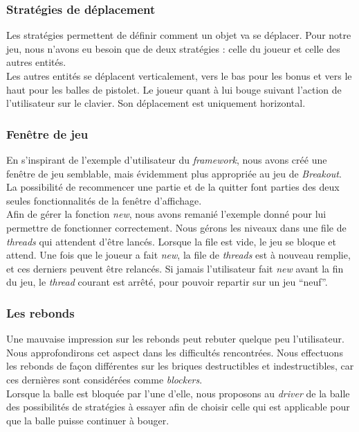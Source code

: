 \documentclass[a4paper,10pt]{article}
\begin{document}
    \subsubsection{Stratégies de déplacement}
        Les stratégies permettent de définir comment un objet va se déplacer. Pour notre jeu, nous n'avons eu besoin
        que de deux stratégies  : celle du joueur et celle des autres entités. \\ Les autres entités
        se déplacent verticalement, vers le bas pour les bonus et vers le haut pour les balles de pistolet.
        Le joueur quant à lui bouge suivant l'action de l'utilisateur sur le clavier. Son déplacement est uniquement horizontal.

    \subsubsection{Fenêtre de jeu}
        En s'inspirant de l'exemple d'utilisateur du \textit{framework}, nous avons créé une fenêtre de jeu semblable,
        mais évidemment plus appropriée au jeu de \textit{Breakout}. La possibilité de recommencer une partie et de la quitter
        font parties des deux seules fonctionnalités de la fenêtre d'affichage. \\

        Afin de gérer la fonction \textit{new}, nous avons remanié l'exemple donné pour lui permettre de fonctionner
        correctement. Nous gérons les niveaux dans une file de \textit{threads} qui attendent d'être lancés. Lorsque la file
        est vide, le jeu se bloque et attend. Une fois que le joueur a fait \textit{new}, la file de \textit{threads} est
        à nouveau remplie, et ces derniers peuvent être relancés. Si jamais l'utilisateur fait \textit{new} avant
        la fin du jeu, le \textit{thread} courant est arrêté, pour pouvoir repartir sur un jeu ``neuf''.

    \subsubsection{Les rebonds}
        Une mauvaise impression sur les rebonds peut rebuter quelque peu l'utilisateur. Nous approfondirons
        cet aspect dans les difficultés rencontrées.  Nous effectuons les rebonds de façon
        différentes sur les briques destructibles et indestructibles, car ces dernières sont considérées comme \textit{blockers}. \\
        Lorsque la balle est bloquée par l'une d'elle, nous proposons au \textit{driver} de la balle des possibilités
        de stratégies à essayer afin de choisir celle qui est applicable pour que la balle puisse continuer à bouger. \\
        
\end{document}
